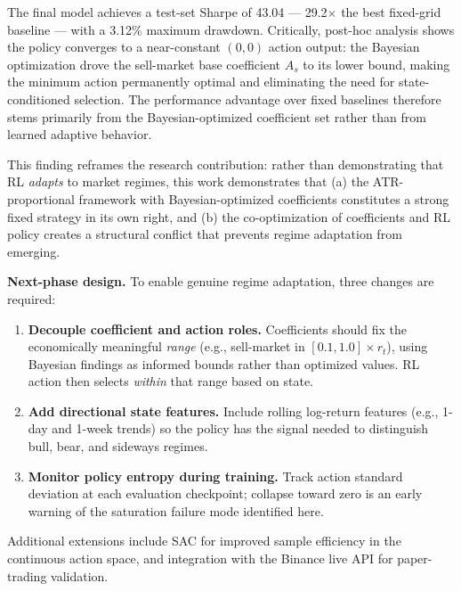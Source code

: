 \documentclass[11pt, a4paper]{article}
\begin{document}
The final model achieves a test-set Sharpe of 43.04 — 29.2$\times$ the best
fixed-grid baseline — with a 3.12\% maximum drawdown.
Critically, post-hoc analysis shows the policy converges to a near-constant
$(0, 0)$ action output: the Bayesian optimization drove the sell-market base
coefficient $A_s$ to its lower bound, making the minimum action permanently
optimal and eliminating the need for state-conditioned selection.
The performance advantage over fixed baselines therefore stems primarily from the
Bayesian-optimized coefficient set rather than from learned adaptive behavior.

This finding reframes the research contribution: rather than demonstrating that
RL \emph{adapts} to market regimes, this work demonstrates that (a) the
ATR-proportional framework with Bayesian-optimized coefficients constitutes a
strong fixed strategy in its own right, and (b) the co-optimization of
coefficients and RL policy creates a structural conflict that prevents regime
adaptation from emerging.

\textbf{Next-phase design.}
To enable genuine regime adaptation, three changes are required:
\begin{enumerate}
    \item \textbf{Decouple coefficient and action roles.}
          Coefficients should fix the economically meaningful \emph{range}
          (e.g., sell-market in $[0.1, 1.0]\times r_t$), using Bayesian findings
          as informed bounds rather than optimized values.
          RL action then selects \emph{within} that range based on state.
    \item \textbf{Add directional state features.}
          Include rolling log-return features (e.g., 1-day and 1-week trends)
          so the policy has the signal needed to distinguish bull, bear, and
          sideways regimes.
    \item \textbf{Monitor policy entropy during training.}
          Track action standard deviation at each evaluation checkpoint;
          collapse toward zero is an early warning of the saturation failure
          mode identified here.
\end{enumerate}

Additional extensions include SAC for improved sample efficiency in the continuous
action space, and integration with the Binance live API for paper-trading
validation.

\newpage


\end{document}
